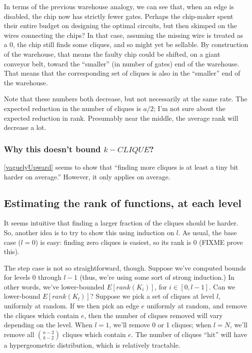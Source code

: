 \documentclass[12pt]{article}
\theoremstyle{definition}
\begin{document}
In terms of the previous warehouse analogy, we can see that,
when an edge is disabled, the chip now has strictly fewer gates.
Perhaps the chip-maker spent their entire budget on designing the
optimal circuits, but then skimped on the wires connecting the chips?
In that case, assuming the missing wire is treated as a 0, the chip still
finds some cliques, and so might yet be sellable.
By construction of the warehouse, that means the faulty chip could be shifted,
on a giant conveyor belt,
toward the ``smaller'' (in number of gates) end of the warehouse.
That means that the corresponding set of cliques is also
in the ``smaller'' end of the warehouse.

Note that these numbers both decrease, but not necessarily at the same rate.
The expected reduction in the number of cliques is $a/2$; I'm not sure
about the expected reduction in rank. Presumably near the middle, the
average rank will decrease a lot.

\subsubsection{Why this doesn't bound $k-CLIQUE$?}

\ref{vaguelyUpward} seems to show that ``finding more cliques is
at least a tiny bit harder on average.'' However, it only applies
on average.

\subsection{Estimating the rank of functions, at each level}

It seems intuitive that finding a larger fraction of the cliques
should be harder.
So, another idea is to try to show this using induction on $l$.
As usual, the base case ($l=0$) is easy: finding zero cliques is easiest,
so its rank is 0 (FIXME prove this).

The step case is not so straightforward, though. Suppose we've computed bounds for
levels 0 through $l-1$ (thus, we're using some sort of strong induction.)
In other words, we've lower-bounded $E[rank(K_i)]$, for $i \in [0,l-1]$.
Can we lower-bound $E[rank(K_l)]$?
Suppose we pick a set of cliques at level $l$, uniformly at random.
If we then pick an edge $e$ uniformly at random, and remove the cliques
which contain $e$, then the number of cliques removed will vary
depending on the level. When $l=1$, we'll remove 0 or 1 cliques; when $l=N$,
we'll remove all ${n-2 \choose k-2}$ cliques which contain $e$.
The number of cliques ``hit'' will have a hypergeometric distribution,
which is relatively tractable.
\end{document}
